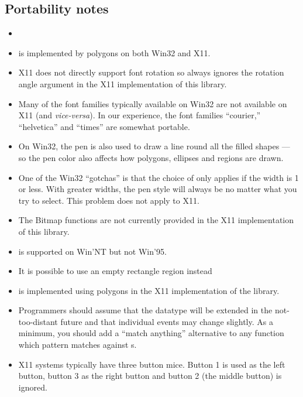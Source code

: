 \subsection{Portability notes}

\begin{itemize}
\item {}
\item {} is implemented by polygons on both Win32 and X11.
\item X11 does not directly support font rotation so 
always ignores the rotation angle argument in the X11 implementation
of this library.

\item Many of the font families typically available on Win32 are not
available on X11 (and {\it vice-versa\/}).  In our experience, the
font families ``courier,'' ``helvetica'' and ``times'' are somewhat
portable.
\item
  On Win32, the pen is also used to draw a line round all
  the filled shapes --- so the pen color also affects how
  polygons, ellipses and regions are drawn.

\item
  One of the Win32 ``gotchas'' is that the choice of 
  only applies if the width is 1 or less.  With greater widths,
  the pen style will always be  no matter what you try to
  select.  This problem does not apply to X11.
\item The Bitmap functions are not currently provided in the X11
implementation of this library.
\item {} is supported on Win'NT but not Win'95.
\item {}
It is possible to use an empty rectangle region instead
\item {} is implemented using polygons in the X11
implementation of the library.
\item
  Programmers should assume that the  datatype will be extended in the
  not-too-distant future and that individual events may change slightly.
  As a minimum, you should add a ``match anything'' alternative to
  any function which pattern matches against s.

\item
X11 systems typically have three button mice.  Button 1 is used as the
left button, button 3 as the right button and button 2 (the middle
button) is ignored.

\end{itemize}


